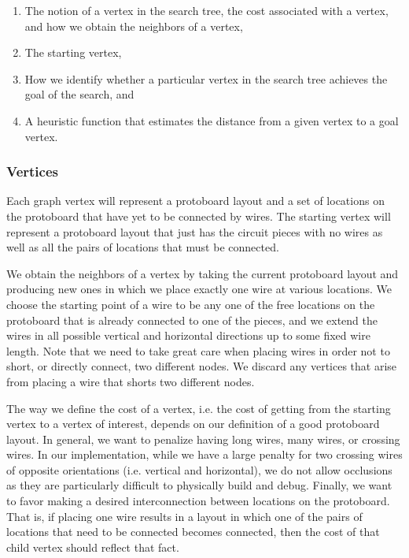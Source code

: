 \begin{enumerate}
\item The notion of a vertex in the
search tree, the cost associated with a vertex, and how we obtain the neighbors
of a vertex,
\item The starting vertex,
\item How we identify whether a particular vertex in the search tree achieves
the goal of the search, and
\item A heuristic function that estimates the distance from a given vertex to a
goal vertex.
\end{enumerate}

\subsubsection{Vertices}

Each graph vertex will represent a protoboard layout and a set of locations on
the protoboard that have yet to be connected by wires. The starting vertex will
represent a protoboard layout that just has the circuit pieces with no
wires as well as all the pairs of locations that must be connected.

We obtain the neighbors of a vertex by taking the current protoboard layout and
producing new ones in which we place exactly one wire at various locations. We
choose the starting point of a wire to be any one of the free locations on the
protoboard that is already connected to one of the pieces, and we extend the
wires in all possible vertical and horizontal directions up to some fixed wire
length. Note that we need
to take great care when placing wires in order not to short, or directly connect,
two different nodes. We
discard any vertices that arise from placing a wire that shorts two different
nodes.

The way we define the cost of a vertex, i.e. the cost of getting from the
starting vertex to a vertex of interest, depends on our definition of a good
protoboard layout. In general, we want to penalize having
long wires, many wires, or crossing wires. In our implementation, while we have
a large penalty for two crossing wires of opposite orientations (i.e. vertical
and horizontal), we do not allow occlusions as
they are particularly difficult to physically build and debug.
Finally, we want to favor making a desired interconnection between locations
on the protoboard. That is, if placing one wire results in a layout in which
one of the pairs of locations that need to be connected becomes connected, then
the cost of that child vertex should reflect that fact.

